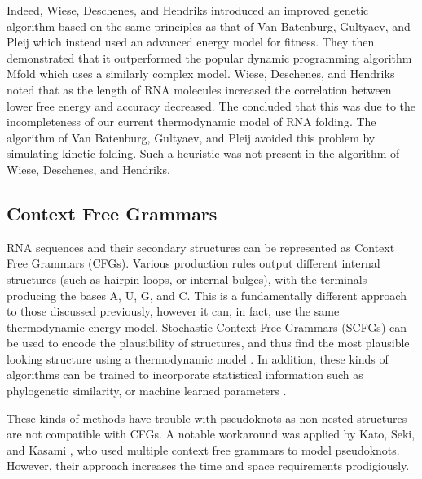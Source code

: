 \documentclass{cshonours}
\begin{document}
Indeed, Wiese, Deschenes, and Hendriks \cite{wiese2008rnapredict} introduced an improved
genetic algorithm based on the same principles as that of Van Batenburg, Gultyaev,
and Pleij which instead used an advanced energy model for fitness. They then
demonstrated that it outperformed the popular dynamic programming algorithm
Mfold \cite{zuker2003mfold} which uses a similarly complex model. Wiese, Deschenes, and Hendriks noted that as the length of RNA molecules increased the correlation between lower free energy and accuracy decreased. The concluded that this was due to the incompleteness of our current thermodynamic model of RNA folding. The algorithm of Van Batenburg, Gultyaev, and Pleij avoided this problem by simulating kinetic folding. Such a heuristic was not present in the algorithm of Wiese, Deschenes, and Hendriks.



\subsection{Context Free Grammars}
RNA sequences and their secondary structures can be represented as Context Free
Grammars (CFGs). Various production rules output different internal structures (such as
hairpin loops, or internal bulges), with the terminals producing the bases A, U, G,
and C. This is a fundamentally different approach to those discussed previously,
however it can, in fact, use the same thermodynamic energy model. Stochastic Context Free Grammars (SCFGs) can be used to encode the plausibility of
structures, and thus find the most plausible looking structure using a thermodynamic model \cite{rivas2012range}. In addition, these kinds of algorithms can be trained to
incorporate statistical information such as phylogenetic similarity, or machine
learned parameters \cite{rivas2012range}. 

These kinds of methods have trouble with pseudoknots as non-nested structures are not compatible with CFGs.
A notable workaround was applied by Kato, Seki, and Kasami \cite{kato2006stochastic}, who used
multiple context free grammars to model pseudoknots. However, their approach
increases the time and space requirements prodigiously.
\end{document}
